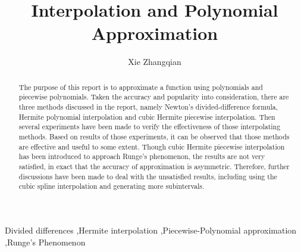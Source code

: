\documentclass[preprint,12pt]{elsarticle}
\begin{document}
\begin{frontmatter}


\title{Interpolation and Polynomial Approximation}




\author{Xie Zhangqian}

\address{No.201600020098, Shandong University}

\begin{abstract}
The purpose of this report is to approximate a function using polynomials and piecewise polynomials. Taken the accuracy and popularity into consideration, there are three methods discussed in the report, namely Newton's divided-difference formula, Hermite polynomial interpolation and cubic Hermite piecewise interpolation. Then several experiments have been made to verify the effectiveness of those interpolating methods. Based on results of those experiments, it can be observed that those methods are effective and useful to some extent. Though cubic Hermite piecewise interpolation has been introduced to approach Runge's phenomenon, the results are not very satisfied, in exact that the accuracy of approximation is asymmetric. Therefore, further discussions have been made to deal with the unsatisfied results, including using the cubic spline interpolation and generating more subintervals.
\end{abstract}

\begin{keyword}
Divided differences \sep Hermite interpolation \sep Piecewise-Polynomial approximation \sep Runge's Phenomenon


\end{keyword}

\end{frontmatter}
\end{document}
